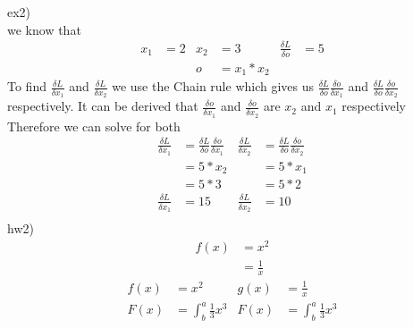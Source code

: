 \documentclass[12pt,english]{article}
\begin{document}
ex2)\\
we know that
\begin{align*}
x_1&=2 & x_2&= 3 & \frac{\delta L}{\delta o}&=5\\
     &     & o   &= x_1 * x_2 
\end{align*}
To find $\frac{\delta L}{\delta x_1}$ and $\frac{\delta L}{\delta x_2}$ we use the Chain rule which gives us $\frac{\delta L}{\delta o}\frac{\delta o}{\delta x_1}$ and $\frac{\delta L}{\delta o}\frac{\delta o}{\delta x_2}$ respectively. It can be derived that $\frac{\delta o}{\delta x_1}$ and $\frac{\delta o}{\delta x_2}$ are $x_2$ and $x_1$ respectively\\
Therefore we can solve for both\\
\begin{align*}
\frac{\delta L}{\delta x_1}&=\frac{\delta L}{\delta o}\frac{\delta o}{\delta x_1} & \frac{\delta L}{\delta x_2}&=\frac{\delta L}{\delta o}\frac{\delta o}{\delta x_2}\\
                                      &=5*x_2  &  &=5 *x_1\\
                                      &=5*3  &  &=5 *2\\
\frac{\delta L}{\delta x_1}&=15  &  \frac{\delta L}{\delta x_2}&=10\\
\end{align*}
hw2)\\
\begin{align*}
  f(x) &= x^2\\
 &= \frac{1}{x}\
\end{align*}
\begin{align*}
  f(x) &= x^2 &  g(x) &= \frac{1}{x}\\
  F(x) &= \int^a_b \frac{1}{3}x^3 &  F(x) &= \int^a_b \frac{1}{3}x^3
\end{align*}
\end{document}
